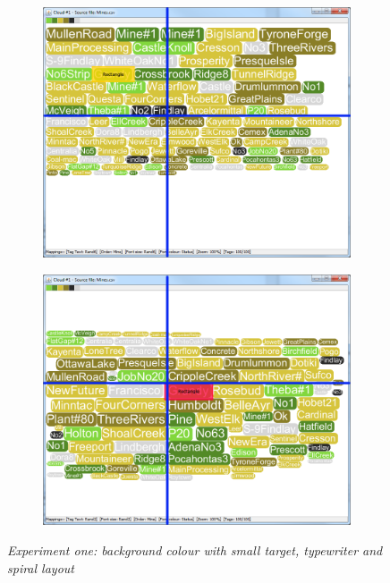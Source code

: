 \begin{figure}[!htb]
\begin{subfigure}{.5\textwidth}
  \includegraphics[scale=0.25]{Experiment1/Trial4/C1S2L2.png}
\end{subfigure}%
\begin{subfigure}{.5\textwidth}
  \centering
 \includegraphics[scale=0.25]{Experiment1/Trial4/C1S2L1.png}
\end{subfigure}
\caption{\textit{Experiment one: background colour with small target, typewriter and spiral layout}}
\label{fig:target4}
\end{figure}


